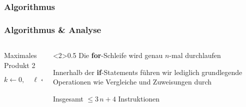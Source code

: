 \begin{frame}
\frametitle<1>{Algorithmus}
\frametitle<2>{Algorithmus \& Analyse}
\begin{columns}[T,onlytextwidth]
    \begin{column}{0.44\textwidth}
        \vspace{-5pt}
        \begin{algorithm}[H]
        	\caption{Maximales Produkt 2}
        	\label{alg:max_prod_ii}
        	\DontPrintSemicolon
        	$k \gets 0, \quad \ell \gets 0$\;
        \end{algorithm}
    \end{column}
    \begin{column}<2>{0.5\textwidth}
        Die \textbf{for}-Schleife wird genau $n$-mal durchlaufen
        
        \medskip
        
        Innerhalb der \textbf{if}-Statements f\"uhren wir lediglich grundlegende Operationen wie Vergleiche und Zuweisungen durch
        
        \medskip
        
        Insgesamt $\leq 3 \, n + 4$ Instruktionen
    \end{column}
\end{columns}
\end{frame}

